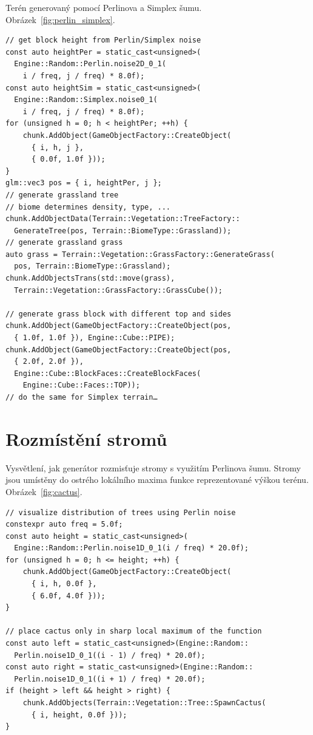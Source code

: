 \documentclass[thesis=M,czech]{FITthesis}[2019/12/23]
\begin{document}
Terén generovaný pomocí Perlinova a Simplex šumu. Obrázek~\ref{fig:perlin_simplex}.

\begin{verbatim}
// get block height from Perlin/Simplex noise
const auto heightPer = static_cast<unsigned>(
  Engine::Random::Perlin.noise2D_0_1(
    i / freq, j / freq) * 8.0f);
const auto heightSim = static_cast<unsigned>(
  Engine::Random::Simplex.noise0_1(
    i / freq, j / freq) * 8.0f);
for (unsigned h = 0; h < heightPer; ++h) {
    chunk.AddObject(GameObjectFactory::CreateObject(
      { i, h, j },
      { 0.0f, 1.0f }));
}
glm::vec3 pos = { i, heightPer, j };
// generate grassland tree
// biome determines density, type, ...
chunk.AddObjectData(Terrain::Vegetation::TreeFactory::
  GenerateTree(pos, Terrain::BiomeType::Grassland));
// generate grassland grass
auto grass = Terrain::Vegetation::GrassFactory::GenerateGrass(
  pos, Terrain::BiomeType::Grassland);
chunk.AddObjectsTrans(std::move(grass), 
  Terrain::Vegetation::GrassFactory::GrassCube());

// generate grass block with different top and sides
chunk.AddObject(GameObjectFactory::CreateObject(pos, 
  { 1.0f, 1.0f }), Engine::Cube::PIPE);
chunk.AddObject(GameObjectFactory::CreateObject(pos,
  { 2.0f, 2.0f }),
  Engine::Cube::BlockFaces::CreateBlockFaces(
    Engine::Cube::Faces::TOP));
// do the same for Simplex terrain…
\end{verbatim}

\section{Rozmístění stromů}

Vysvětlení, jak generátor rozmisťuje stromy s využitím Perlinova šumu. Stro\-my jsou umístěny do ostrého lokálního maxima funkce reprezentované výškou terénu. Obrázek~\ref{fig:cactus}.

\begin{verbatim}
// visualize distribution of trees using Perlin noise
constexpr auto freq = 5.0f;
const auto height = static_cast<unsigned>(
  Engine::Random::Perlin.noise1D_0_1(i / freq) * 20.0f);
for (unsigned h = 0; h <= height; ++h) {
    chunk.AddObject(GameObjectFactory::CreateObject(
      { i, h, 0.0f },
      { 6.0f, 4.0f }));
}

// place cactus only in sharp local maximum of the function
const auto left = static_cast<unsigned>(Engine::Random::
  Perlin.noise1D_0_1((i - 1) / freq) * 20.0f);
const auto right = static_cast<unsigned>(Engine::Random::
  Perlin.noise1D_0_1((i + 1) / freq) * 20.0f);
if (height > left && height > right) {
    chunk.AddObjects(Terrain::Vegetation::Tree::SpawnCactus(
      { i, height, 0.0f }));
}
\end{verbatim}
\end{document}
